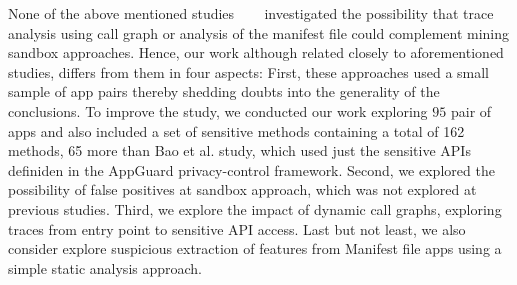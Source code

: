 None of the above mentioned studies ~\cite{DBLP:conf/icse/JamrozikSZ16}~\cite{DBLP:conf/wcre/BaoLL18}~\cite{le2018towards} investigated the possibility that trace analysis using call graph or analysis of the manifest file could complement mining sandbox approaches. Hence, our work although related closely to aforementioned studies, differs from them in four aspects: First, these approaches used a small sample of app pairs thereby shedding doubts into the generality of the conclusions. To improve the study, we conducted our work exploring $95$ pair of apps and also included a set of sensitive methods containing a total of 162 methods, 65 more than Bao et al. study, which used just the sensitive APIs definiden in the AppGuard privacy-control framework\cite{DBLP:conf/esorics/BackesGHMS13}. Second, we explored the possibility of false positives at sandbox approach, which was not explored at previous studies. Third, we explore the impact of dynamic call graphs, exploring traces from entry point to sensitive API access. Last but not least, we also consider explore suspicious extraction of features from Manifest file apps using a simple static analysis approach.